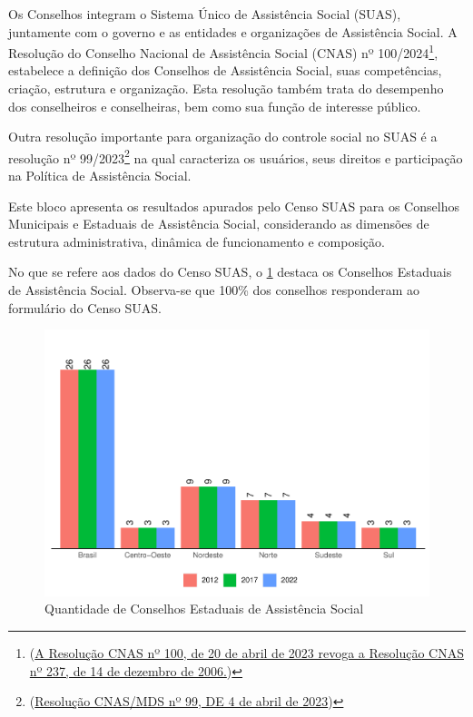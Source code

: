 \documentclass[
  brazilian]{report}
\begin{document}
Os Conselhos integram o Sistema Único de Assistência Social (SUAS),
juntamente com o governo e as entidades e organizações de Assistência
Social. A Resolução do Conselho Nacional de Assistência Social (CNAS) nº
100/2024\footnote{(\url{A Resolução CNAS nº 100, de 20 de abril de 2023 revoga a Resolução CNAS nº 237, de 14 de dezembro de 2006.})},
estabelece a definição dos Conselhos de Assistência Social, suas
competências, criação, estrutura e organização. Esta resolução também
trata do desempenho dos conselheiros e conselheiras, bem como sua função
de interesse público.

Outra resolução importante para organização do controle social no SUAS é
a resolução nº
99/2023\footnote{(\url{Resolução CNAS/MDS nº 99, DE 4 de abril de 2023})}
na qual caracteriza os usuários, seus direitos e participação na
Política de Assistência Social.

Este bloco apresenta os resultados apurados pelo Censo SUAS para os
Conselhos Municipais e Estaduais de Assistência Social, considerando as
dimensões de estrutura administrativa, dinâmica de funcionamento e
composição.

No que se refere aos dados do Censo SUAS, o \cref{fig:qtd-ceas} destaca
os Conselhos Estaduais de Assistência Social. Observa-se que 100\% dos
conselhos responderam ao formulário do Censo SUAS.

\begin{figure}
\includegraphics{Censo-SUAS-2022_files/figure-latex/qtd-ceas-1} \caption[Quantidade de Conselhos Estaduais de Assistência Social]{Quantidade de Conselhos Estaduais de Assistência Social}\label{fig:qtd-ceas}
\end{figure}
\end{document}
